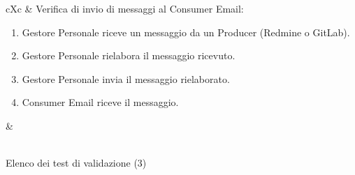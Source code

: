 \begin{table}[H]
\begin{VTtable}[1.7]{\textwidth}{cXc}
        \addtotv & Verifica di invio di messaggi al Consumer Email:
		\begin{enumerate}
			\item Gestore Personale riceve un messaggio da un Producer (Redmine o GitLab).
            \item Gestore Personale rielabora il messaggio ricevuto.
			\item Gestore Personale invia il messaggio rielaborato.
            \item Consumer Email riceve il messaggio.
		\end{enumerate}
		& \TNI \\
        \bottomrule\\
    \end{VTtable}
	\caption{Elenco dei test di validazione (3)}
\end{table}
